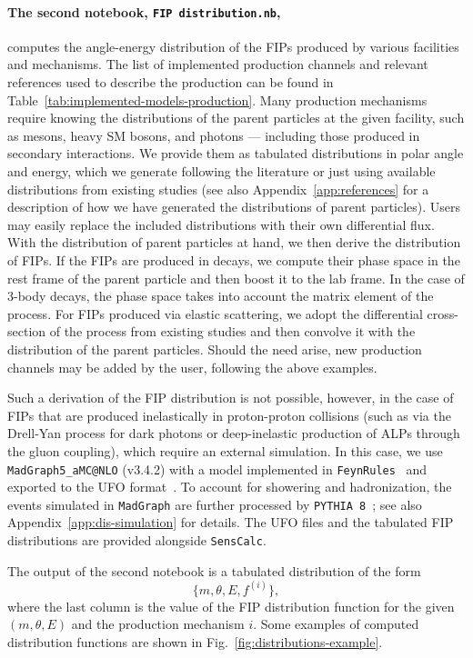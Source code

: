 \documentclass[
    aps,prd,
    twocolumn,
    nofootinbib,
    superscriptaddress,
]{revtex4}
\begin{document}
\paragraph{The second notebook, \texttt{FIP distribution.nb},} computes the angle-energy distribution of the FIPs produced by various facilities and mechanisms. The list of implemented production channels and relevant references used to describe the production can be found in Table~\ref{tab:implemented-models-production}. Many production mechanisms require knowing the distributions of the parent particles at the given facility, such as mesons, heavy SM bosons, and photons --- including those produced in secondary interactions. We provide them as tabulated distributions in polar angle and energy, which we generate following the literature or just using available distributions from existing studies (see also Appendix~\ref{app:references} for a description of how we have generated the distributions of parent particles). Users may easily replace the included distributions with their own differential flux. With the distribution of parent particles at hand, we then derive the distribution of FIPs. If the FIPs are produced in decays, we compute their phase space in the rest frame of the parent particle and then boost it to the lab frame. In the case of 3-body decays, the phase space takes into account the matrix element of the process. For FIPs produced via elastic scattering, we adopt the differential cross-section of the process from existing studies and then convolve it with the distribution of the parent particles. Should the need arise, new production channels may be added by the user, following the above examples.

Such a derivation of the FIP distribution is not possible, however, in the case of FIPs that are produced inelastically in proton-proton collisions (such as via the Drell-Yan process for dark photons or deep-inelastic production of ALPs through the gluon coupling), which require an external simulation. In this case, we use \texttt{MadGraph5\_aMC@NLO} (v3.4.2) \cite{Alwall:2014hca} with a model implemented in \texttt{FeynRules}~\cite{Alloul:2013bka} and exported to the UFO format~\cite{Degrande:2011ua}. To account for showering and hadronization, the events simulated in \texttt{MadGraph} are further processed by \texttt{PYTHIA~8}~\cite{Sjostrand:2014zea}; see also Appendix~\ref{app:dis-simulation} for details. The UFO files and the tabulated FIP distributions are provided alongside \texttt{SensCalc}. 

The output of the second notebook is a tabulated distribution of the form 
\begin{equation}
\{m,\theta,E,f^{(i)}\},
\end{equation}
where the last column is the value of the FIP distribution function for the given $(m,\theta,E)$ and the production mechanism $i$. Some examples of computed distribution functions are shown in Fig.~\ref{fig:distributions-example}.
\end{document}
